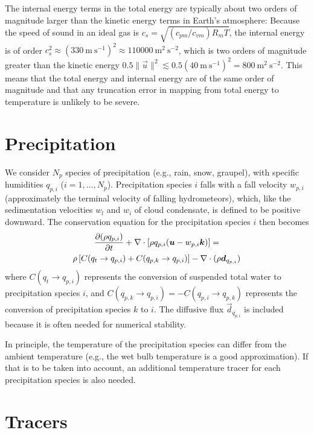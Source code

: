 \documentclass{report}
\begin{document}
The internal energy terms in the total energy are typically about two orders of magnitude larger than the kinetic energy terms in Earth's atmosphere: Because the speed of sound in an ideal gas is $c_s = \sqrt{(c_{pm}/c_{vm}) R_m T}$, the internal energy is of order $c_s^2 \approx (330~\mathrm{m~s^{-1}})^2 \approx 110000~\mathrm{m^2~s^{-2}}$, which is two orders of magnitude greater than the kinetic energy $0.5 \|\vec{u}\|^2 \lesssim 0.5(40~\mathrm{m~s^{-1}})^2 = 800~\mathrm{m^2~s^{-2}}$. This means that the total energy and internal energy are of the same order of magnitude and that any truncation error in mapping from total energy to temperature is unlikely to be severe.

\section{Precipitation}

We  consider $N_p$ species of precipitation (e.g., rain, snow, graupel), with specific humidities $q_{p,i}$ ($i=1,\dots,N_p$). Precipitation species $i$ falls with a fall velocity $w_{p,i}$ (approximately the terminal velocity of falling hydrometeors), which, like the sedimentation velocities $w_l$ and $w_i$ of cloud condensate, is defined to be positive downward. The conservation equation for the precipitation species $i$ then becomes
\begin{multline}
\frac{\partial (\rho q_{p,i})}{\partial t} + \nabla \cdot \left[\rho q_{p,i} (\boldsymbol{{u}} - w_{p,i} \boldsymbol{{k}}) \right] =\\
\rho \left[C(q_t \rightarrow q_{p,i}) + C(q_{p,k} \rightarrow q_{p,i}) \right] -\nabla \cdot (\rho \boldsymbol{{d}}_{q_{p, i}})
\label{eq:precip}
\end{multline}
where $C(q_t \rightarrow q_{p,i})$ represents the conversion of suspended total water to precipitation species $i$, and $C(q_{p,k} \rightarrow q_{p,i}) = -C(q_{p,i} \rightarrow q_{p,k})$ represents the conversion of precipitation species $k$ to $i$. The diffusive flux $\vec{d}_{q_{p, i}}$ is included because it is often needed for numerical stability.

In principle, the temperature of the precipitation species can differ from the ambient temperature (e.g., the wet bulb temperature is a good approximation). If that is to be taken into account, an additional temperature tracer for each precipitation species is also needed.

\section{Tracers}
\end{document}
